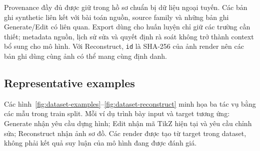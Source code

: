 \documentclass[a4paper,12pt]{article}
\begin{document}
Provenance đầy đủ được giữ trong hồ sơ chuẩn bị dữ liệu ngoại tuyến. Các bản ghi synthetic liên kết với bài toán nguồn, source family và những bản ghi Generate/Edit có liên quan. Export dùng cho huấn luyện chỉ giữ các trường cần thiết; metadata nguồn, lịch sử sửa và quyết định rà soát không trở thành context bổ sung cho mô hình. Với Reconstruct, \texttt{id} là SHA-256 của ảnh render nên các bản ghi dùng cùng ảnh có thể mang cùng định danh.

\subsection{Representative examples}
Các hình~\ref{fig:dataset-examples}--\ref{fig:dataset-reconstruct} minh họa ba tác vụ bằng các mẫu trong train split. Mỗi ví dụ trình bày input và target tương ứng: Generate nhận yêu cầu dựng hình; Edit nhận mã TikZ hiện tại và yêu cầu chỉnh sửa; Reconstruct nhận ảnh sơ đồ. Các render được tạo từ target trong dataset, không phải kết quả suy luận của mô hình đang được đánh giá.
\end{document}
